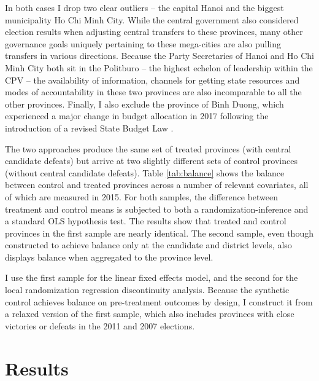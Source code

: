 \documentclass[12pt]{article}
\newcommand{\1}{\mathbbm{1}}
\begin{document}
In both cases I drop two clear outliers -- the capital Hanoi and the biggest municipality Ho Chi Minh City. While the central government also considered election results when adjusting central transfers to these provinces, many other governance goals uniquely pertaining to these mega-cities are also pulling transfers in various directions. Because the Party Secretaries of Hanoi and Ho Chi Minh City both sit in the Politburo -- the highest echelon of leadership within the CPV -- the availability of information, channels for getting state resources and modes of accountability in these two provinces are also incomparable to all the other provinces. Finally, I also exclude the province of Binh Duong, which experienced a major change in budget allocation in 2017 following the introduction of a revised State Budget Law \citep{BaoViet2016}.

The two approaches produce the same set of treated provinces (with central candidate defeats) but arrive at two slightly different sets of control provinces (without central candidate defeats). 
Table \ref{tab:balance} shows the balance between control and treated provinces across a number of relevant covariates, all of which are measured in 2015. %
For both samples, the difference between treatment and control means is subjected to both a randomization-inference and a standard OLS hypothesis test. The results show that treated and control provinces in the first sample are nearly identical. The second sample, even though constructed to achieve balance only at the candidate and district levels, also displays balance when aggregated to the province level. 

I use the first sample for the linear fixed effects model, and the second for the local randomization regression discontinuity analysis. Because the synthetic control achieves balance on pre-treatment outcomes by design, I construct it from a relaxed version of the first sample, which also includes provinces with close victories or defeats in the 2011 and 2007 elections.



\section{Results}
\label{sec:results}

\end{document}
